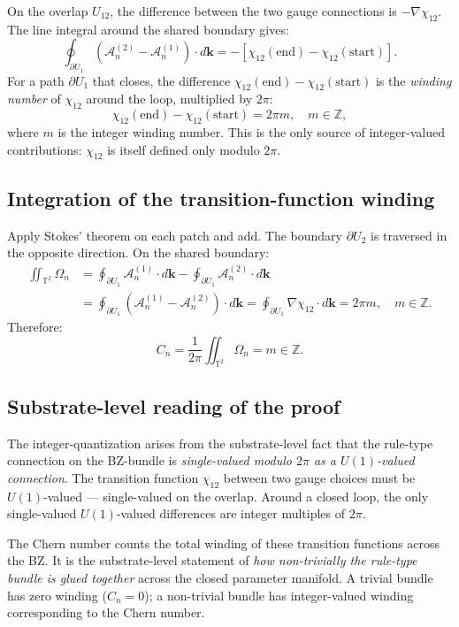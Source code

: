 \documentclass[11pt,a4paper]{article}
\begin{document}
On the overlap $U_{12}$, the difference between the two gauge connections is $-\nabla\chi_{12}$. The line integral around the shared boundary gives:
\[
\oint_{\partial U_1}(\mathcal{A}_n^{(2)} - \mathcal{A}_n^{(1)})\cdot d\mathbf{k} = -[\chi_{12}(\mathrm{end}) - \chi_{12}(\mathrm{start})].
\]
For a path $\partial U_1$ that closes, the difference $\chi_{12}(\mathrm{end}) - \chi_{12}(\mathrm{start})$ is the \emph{winding number} of $\chi_{12}$ around the loop, multiplied by $2\pi$:
\[
\chi_{12}(\mathrm{end}) - \chi_{12}(\mathrm{start}) = 2\pi m, \quad m \in \mathbb{Z},
\]
where $m$ is the integer winding number. This is the only source of integer-valued contributions: $\chi_{12}$ is itself defined only modulo $2\pi$.

\subsection{Integration of the transition-function winding}

Apply Stokes' theorem on each patch and add. The boundary $\partial U_2$ is traversed in the opposite direction. On the shared boundary:
\begin{align*}
\iint_{\mathbb{T}^2}\Omega_n &= \oint_{\partial U_1}\mathcal{A}_n^{(1)}\cdot d\mathbf{k} - \oint_{\partial U_1}\mathcal{A}_n^{(2)}\cdot d\mathbf{k} \\
&= \oint_{\partial U_1}(\mathcal{A}_n^{(1)} - \mathcal{A}_n^{(2)})\cdot d\mathbf{k} = \oint_{\partial U_1}\nabla\chi_{12}\cdot d\mathbf{k} = 2\pi m, \quad m \in \mathbb{Z}.
\end{align*}
Therefore:
\[
C_n = \frac{1}{2\pi}\iint_{\mathbb{T}^2}\Omega_n = m \in \mathbb{Z}.
\]

\subsection{Substrate-level reading of the proof}

The integer-quantization arises from the substrate-level fact that the rule-type connection on the BZ-bundle is \emph{single-valued modulo $2\pi$ as a $U(1)$-valued connection}. The transition function $\chi_{12}$ between two gauge choices must be $U(1)$-valued --- single-valued on the overlap. Around a closed loop, the only single-valued $U(1)$-valued differences are integer multiples of $2\pi$.

The Chern number counts the total winding of these transition functions across the BZ. It is the substrate-level statement of \emph{how non-trivially the rule-type bundle is glued together} across the closed parameter manifold. A trivial bundle has zero winding ($C_n = 0$); a non-trivial bundle has integer-valued winding corresponding to the Chern number.
\end{document}

